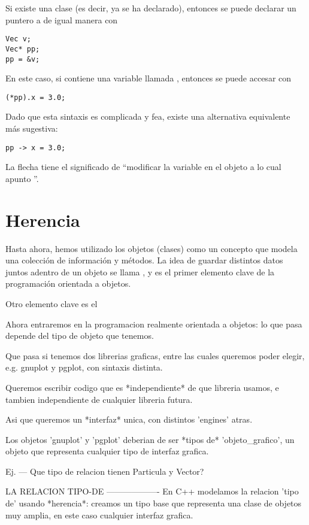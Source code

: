 Si existe una clase  (es decir, ya se ha declarado), entonces se puede declarar un puntero a  de igual manera con
\begin{lstlisting}
Vec v;
Vec* pp;
pp = &v;
\end{lstlisting}
En este caso, si  contiene una variable llamada , entonces se puede accesar con
\begin{lstlisting}
(*pp).x = 3.0;
\end{lstlisting}
Dado que esta sintaxis es complicada y fea, existe una alternativa equivalente más sugestiva:
\begin{lstlisting}
pp -> x = 3.0;
\end{lstlisting}
La flecha tiene el significado de ``modificar la variable  en el objeto a lo cual apunto ''.

\section{Herencia}

Hasta ahora, hemos utilizado los objetos (clases) como un concepto que modela una colección de información y métodos. 
La idea de guardar distintos datos juntos adentro de un objeto se llama , y es el primer elemento clave de la programación orientada a objetos.

Otro elemento clave es el 

Ahora entraremos en la programacion realmente orientada a objetos: lo que pasa depende del tipo de objeto que tenemos.

Que pasa si tenemos dos librerias graficas, entre las cuales  queremos poder elegir, e.g. gnuplot y pgplot, con sintaxis distinta.

Queremos escribir codigo que es *independiente* de que libreria usamos, e tambien independiente de cualquier libreria futura.

Asi que queremos un *interfaz* unica, con distintos 'engines' atras.


Los objetos 'gnuplot' y 'pgplot' deberian de ser *tipos de* 'objeto_grafico', un objeto que representa cualquier tipo de interfaz grafica.

Ej.
---
Que tipo de relacion tienen Particula y Vector?


LA RELACION TIPO-DE
-------------------
En C++ modelamos la relacion 'tipo de' usando *herencia*:
creamos un tipo base que representa una clase de objetos muy amplia, en este caso cualquier interfaz grafica.

